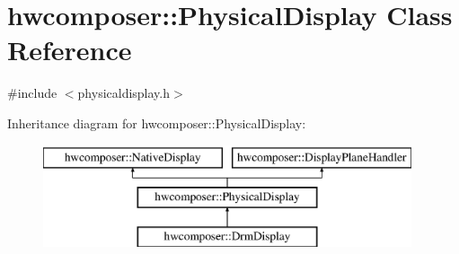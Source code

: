 \hypertarget{classhwcomposer_1_1PhysicalDisplay}{}\section{hwcomposer\+:\+:Physical\+Display Class Reference}
\label{classhwcomposer_1_1PhysicalDisplay}


{\ttfamily \#include $<$physicaldisplay.\+h$>$}

Inheritance diagram for hwcomposer\+:\+:Physical\+Display\+:\begin{figure}[H]
\begin{center}
\leavevmode
\includegraphics[height=3.000000cm]{classhwcomposer_1_1PhysicalDisplay}
\end{center}
\end{figure}
